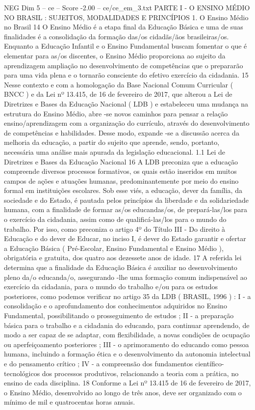 \begin{textsample}{NEG Dim 5 – ce – Score -2.00 – ce/ce\_em\_3.txt}  \label{ex:f5_neg_032}
PARTE I - O ENSINO MÉDIO NO BRASIL : SUJEITOS, MODALIDADES E PRINCÍPIOS 1.
O Ensino Médio no Brasil 14 O Ensino Médio é a etapa final da Educação Básica e uma de suas finalidades é a consolidação da formação das/os cidadãs/ãos brasileiras/os.
Enquanto a Educação Infantil e o Ensino Fundamental buscam fomentar o que é elementar para as/os discentes, o Ensino Médio proporciona ao sujeito da aprendizagem ampliação no desenvolvimento de competências que o prepararão para uma vida plena e o tornarão consciente do efetivo exercício da cidadania. 15 Nesse contexto e com a homologação da Base Nacional Comum Curricular ( BNCC ) e da Lei nº 13.415, de 16 de fevereiro de 2017, que alterou a Lei de Diretrizes e Bases da Educação Nacional ( LDB ) e estabeleceu uma mudança na estrutura do Ensino Médio, abre -se novos caminhos para pensar a relação ensino/aprendizagem com a organização do currículo, através do desenvolvimento de competências e habilidades.
Desse modo, expande -se a discussão acerca da melhoria da educação, a partir do sujeito que aprende, sendo, portanto, necessária uma análise mais apurada da legislação educacional. 1.1 Lei de Diretrizes e Bases da Educação Nacional 16 A LDB preconiza que a educação compreende diversos processos formativos, os quais estão inseridos em muitos campos de ações e atuações humanas, predominantemente por meio do ensino formal em instituições escolares.
Sob esse viés, a educação, dever da família, da sociedade e do Estado, é pautada pelos princípios da liberdade e da solidariedade humana, com a finalidade de formar as/os educandas/os, de prepará-las/los para o exercício da cidadania, assim como de qualificá-las/los para o mundo do trabalho.
Por isso, como preconiza o artigo 4º do Título III - Do direito à Educação e do dever de Educar, no inciso I, é dever do Estado garantir e ofertar a Educação Básica ( Pré-Escolar, Ensino Fundamental e Ensino Médio ), obrigatória e gratuita, dos quatro aos dezessete anos de idade. 17 A referida lei determina que a finalidade da Educação Básica é auxiliar no desenvolvimento pleno da/o educanda/o, assegurando -lhe uma formação comum indispensável ao exercício da cidadania, para o mundo do trabalho e/ou para os estudos posteriores, como podemos verificar no artigo 35 da LDB ( BRASIL, 1996 ) : I - a consolidação e o aprofundamento dos conhecimentos adquiridos no Ensino Fundamental, possibilitando o prosseguimento de estudos ; II - a preparação básica para o trabalho e a cidadania do educando, para continuar aprendendo, de modo a ser capaz de se adaptar, com flexibilidade, a novas condições de ocupação ou aperfeiçoamento posteriores ; III - o aprimoramento do educando como pessoa humana, incluindo a formação ética e o desenvolvimento da autonomia intelectual e do pensamento crítico ; IV - a compreensão dos fundamentos científico-tecnológicos dos processos produtivos, relacionando a teoria com a prática, no ensino de cada disciplina. 18 Conforme a Lei nº 13.415 de 16 de fevereiro de 2017, o Ensino Médio, desenvolvido ao longo de três anos, deve ser organizado com o mínimo de mil e quatrocentas horas anuais.

\end{textsample}
